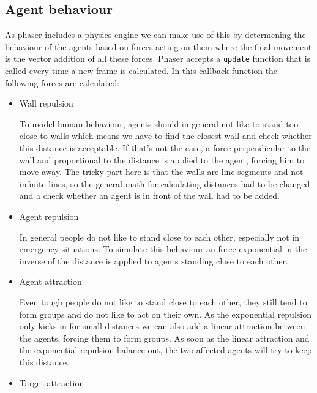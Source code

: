 \documentclass[11pt]{article}
\begin{document}
\subsection{Agent behaviour}

As phaser includes a physics engine we can make use of this by determening the behaviour of the agents based on forces acting on them where the final movement is the vector addition of all these forces. Phaser accepts a \texttt{update} function that is called every time a new frame is calculated. In this callback function the following forces are calculated:

\begin{itemize}
    \item Wall repulsion
    
    To model human behaviour, agents should in general not like to stand too close to walls which means we have to find the closest wall and check whether this distance is acceptable. If that's not the case, a force perpendicular to the wall and proportional to the distance is applied to the agent, forcing him to move away. The tricky part here is that the walls are line segments and not infinite lines, so the general math for calculating distances had to be changed and a check whether an agent is in front of the wall had to be added.

    \item Agent repulsion
    
    In general people do not like to stand close to each other, especially not in emergency situations. To simulate this behaviour an force exponential in the inverse of the distance is applied to agents standing close to each other.

    \item Agent attraction
    
    Even tough people do not like to stand close to each other, they still tend to form groups and do not like to act on their own. As the exponential repulsion only kicks in for small distances we can also add a linear attraction between the agents, forcing them to form groups. As soon as the linear attraction and the exponential repulsion balance out, the two affected agents will try to keep this distance.

    \item Target attraction
    

\end{itemize}
\end{document}
